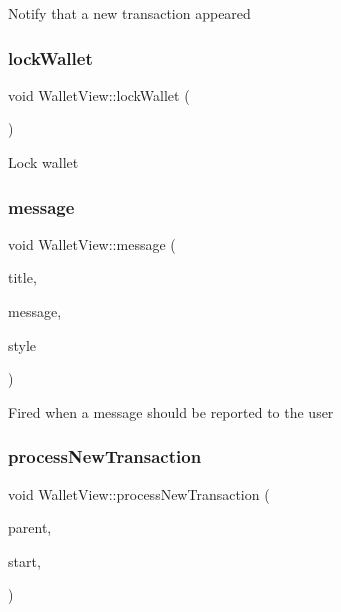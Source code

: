 Notify that a new transaction appeared \mbox{\label{class_wallet_view_ae76bd29c36d1cfa9bc986924a0454eeb}} 
\subsubsection{\texorpdfstring{lockWallet}{lockWallet}}
{\footnotesize\ttfamily void Wallet\+View\+::lock\+Wallet (\begin{DoxyParamCaption}{ }\end{DoxyParamCaption})\hspace{0.3cm}{\ttfamily [slot]}}

Lock wallet \mbox{\label{class_wallet_view_a901527bc1086ef5443a264af651de178}} 
\subsubsection{\texorpdfstring{message}{message}}
{\footnotesize\ttfamily void Wallet\+View\+::message (\begin{DoxyParamCaption}\item[{const Q\+String \&}]{title,  }\item[{const Q\+String \&}]{message,  }\item[{unsigned int}]{style }\end{DoxyParamCaption})\hspace{0.3cm}{\ttfamily [signal]}}

Fired when a message should be reported to the user \mbox{\label{class_wallet_view_addde7d2260658ee06f47f9c095a8cb2a}} 
\subsubsection{\texorpdfstring{processNewTransaction}{processNewTransaction}}
{\footnotesize\ttfamily void Wallet\+View\+::process\+New\+Transaction (\begin{DoxyParamCaption}\item[{const Q\+Model\+Index \&}]{parent,  }\item[{int}]{start,  }\item[{int}]{ }\end{DoxyParamCaption})\hspace{0.3cm}{\ttfamily [slot]}}

